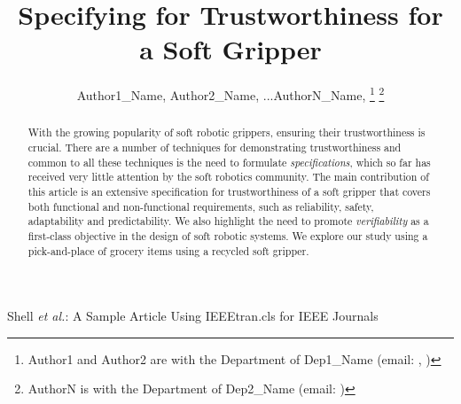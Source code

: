 \documentclass[lettersize,journal]{IEEEtran}
\begin{document}
\title{Specifying for Trustworthiness for a Soft Gripper}

\author{Author1\_Name, Author2\_Name, ...AuthorN\_Name,
	\thanks{Author1 and Author2 are with the Department of Dep1\_Name (email: , )}
	\thanks{AuthorN is with the Department of Dep2\_Name (email: )}}
%
{Shell \MakeLowercase{\textit{et al.}}: A Sample Article Using IEEEtran.cls for IEEE Journals}




\maketitle

\begin{abstract}
With the growing popularity of soft robotic grippers, ensuring their trustworthiness is crucial. 
There are a number of techniques for demonstrating trustworthiness and common to all these techniques is the need to formulate \emph{specifications}, which so far has received very little attention by the soft robotics community. 
The main contribution of this article is an extensive specification for trustworthiness of a soft gripper that covers both functional and non-functional requirements, such as reliability, safety, adaptability and predictability. 
We also highlight the need to promote \emph{verifiability} as a first-class objective in the design of soft robotic systems. 
We explore our study using a pick-and-place of grocery items using a recycled soft gripper.
\end{abstract}
\end{document}
